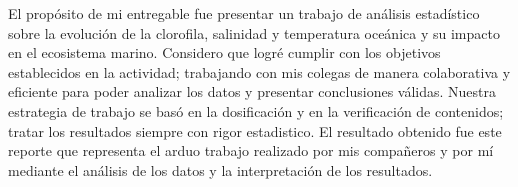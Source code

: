 El propósito de mi entregable fue presentar un trabajo de análisis estadístico sobre la evolución de la clorofila, salinidad y temperatura oceánica y su impacto en el ecosistema marino. Considero que logré cumplir con los objetivos establecidos en la actividad; trabajando con mis colegas de manera colaborativa y eficiente para poder analizar los datos y presentar conclusiones válidas. Nuestra estrategia de trabajo se basó en la dosificación y en la verificación de contenidos; tratar los resultados siempre con rigor estadistico. El resultado obtenido fue este reporte que representa el arduo trabajo realizado por mis compañeros y por mí mediante el análisis de los datos y la interpretación de los resultados.